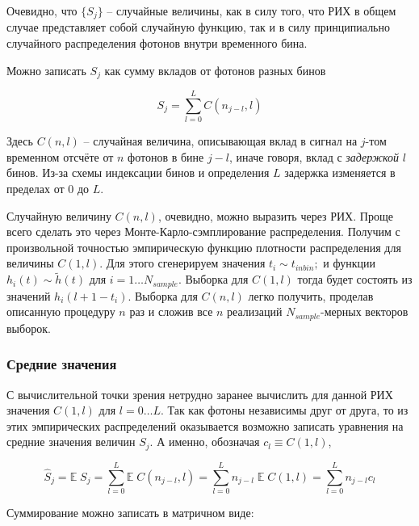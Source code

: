 \documentclass[12pt]{article}
\begin{document}
	Очевидно, что $\{ S_j \}$ -- случайные величины, как в силу того, что РИХ в общем случае представляет собой случайную функцию, так и в силу принципиально случайного распределения фотонов внутри временного бина.
	
	Можно записать $S_j$ как сумму вкладов от фотонов разных бинов
	
	\begin{equation}
		S_j = \sum_{l=0}^{L} C(n_{j-l}, l)
	\end{equation}

	Здесь $C(n, l)$ -- случайная величина, описывающая вклад в сигнал на $j$-том временном отсчёте от $n$ фотонов в бине $j - l$, иначе говоря, вклад с \textit{задержкой} $l$ бинов. Из-за схемы индексации бинов и определения $L$ задержка изменяется в пределах от $0$ до $L$.
	
	Случайную величину $C(n, l)$, очевидно, можно выразить через РИХ. Проще всего сделать это через Монте-Карло-сэмплирование распределения. Получим с произвольной точностью эмпирическую функцию плотности распределения для величины $C(1, l)$. Для этого сгенерируем значения $t_i \sim t_{inbin};$ и функции $h_i(t) \sim \tilde{h}(t)$ для $i = 1 \ldots N_{sample}$. Выборка для $C(1, l)$ тогда будет состоять из значений $h_i(l + 1 - t_i)$. Выборка для $C(n, l)$ легко получить, проделав описанную процедуру $n$ раз и сложив все $n$ реализаций $N_{sample}$-мерных векторов выборок.
	
	\subsubsection{Средние значения}
	
	С вычислительной точки зрения нетрудно заранее вычислить для данной РИХ значения $C(1, l)$ для $l = 0 \ldots L$. Так как фотоны независимы друг от друга, то из этих эмпирических распределений оказывается возможно записать уравнения на средние значения величин $S_j$. А именно, обозначая $c_l \equiv C(1, l)$,
	
	\begin{equation}
		\hat{S}_j = \mathbb{E} \; S_j = \sum_{l=0}^{L} \mathbb{E} \; C(n_{j-l}, l) = \sum_{l=0}^{L} n_{j-l} \; \mathbb{E} \; C(1, l) = \sum_{l=0}^{L} n_{j-l} c_l
	\end{equation}

	Суммирование можно записать в матричном виде:
	
\end{document}
